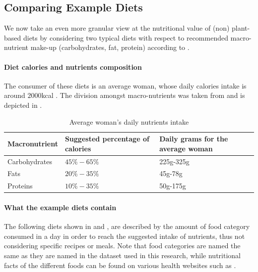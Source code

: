 \documentclass{article}
\begin{document}
\subsection{Comparing Example Diets}
We now take an even more granular view at the nutritional value of (non) plant-based diets by considering two typical diets with respect to recommended macro-nutrient make-up (carbohydrates, fat, protein) according to \cite{Healthline}.

\paragraph*{Diet calories and nutrients composition}
The consumer of these diets is an average woman, whose daily calories intake is around $2000$kcal \cite{NHS}. The division amongst macro-nutrients was taken from \citet{Healthline} and is depicted in  .

\begin{table}[h]
  \caption{Average woman's daily nutrients intake}
  \label{tbl:composition}
  \centering
  \begin{tabular}{lll}
    \toprule
    Macronutrient     & Suggested percentage of calories   & Daily grams for the average woman  \\
    \midrule
    Carbohydrates & $45\%-65\%$ &  225g-325g  \\
    Fats    & $20\%-35\% $  & 45g-78g \\
    Proteins & $10\%-35\%$ & 50g-175g \\
    \bottomrule
  \end{tabular}
\end{table}

\paragraph*{What the example diets contain}
The following diets shown in  and , are described by the amount of food category consumed in a day in order to reach the suggested intake of nutrients, thus not considering specific recipes or meals. Note that food categories are named the same as they are named in the dataset used in this research, while nutritional facts of the different foods can  be found on various  health websites such as \cite{Healthline}. 
\end{document}
